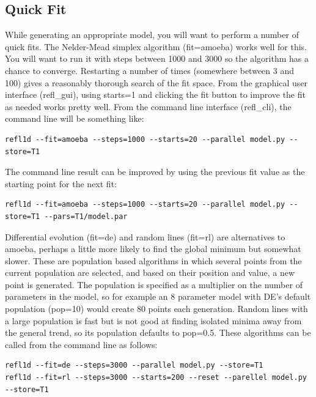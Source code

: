 \documentclass[letterpaper,10pt,english]{sphinxmanual}
\begin{document}
\subsection{Quick Fit}
\label{guide/fitting:quick-fit}
While generating an appropriate model, you will want to perform a number
of quick fits.  The Nelder-Mead simplex algorithm (fit=amoeba) works well
for this.  You will want to run it with steps between 1000 and 3000 so
the algorithm has a chance to converge.  Restarting a number of times
(somewhere between 3 and 100) gives a reasonably thorough search of the
fit space.  From the graphical user interface (refl\_gui), using starts=1
and clicking the fit button to improve the fit as needed works pretty well.
From the command line interface (refl\_cli), the command line will be
something like:

\begin{Verbatim}[commandchars=@\[\]]
refl1d --fit=amoeba --steps=1000 --starts=20 --parallel model.py --store=T1
\end{Verbatim}

The command line result can be improved by using the previous fit value as
the starting point for the next fit:

\begin{Verbatim}[commandchars=@\[\]]
refl1d --fit=amoeba --steps=1000 --starts=20 --parallel model.py --store=T1 --pars=T1/model.par
\end{Verbatim}

Differential evolution (fit=de) and random lines (fit=rl) are alternatives
to amoeba, perhaps a little more likely to find the global minimum but
somewhat slower. These are population based algorithms in which several
points from the current population are selected, and based on their
position and value, a new point is generated.  The population is specified
as a multiplier on the number of parameters in the model, so for example
an 8 parameter model with DE's default population (pop=10) would create 80
points each generation.  Random lines with a large population is fast but
is not good at finding isolated minima away from the general trend, so its
population defaults to pop=0.5.  These algorithms can be called from the
command line as follows:

\begin{Verbatim}[commandchars=@\[\]]
refl1d --fit=de --steps=3000 --parallel model.py --store=T1
refl1d --fit=rl --steps=3000 --starts=200 --reset --parellel model.py --store=T1
\end{Verbatim}
\end{document}
